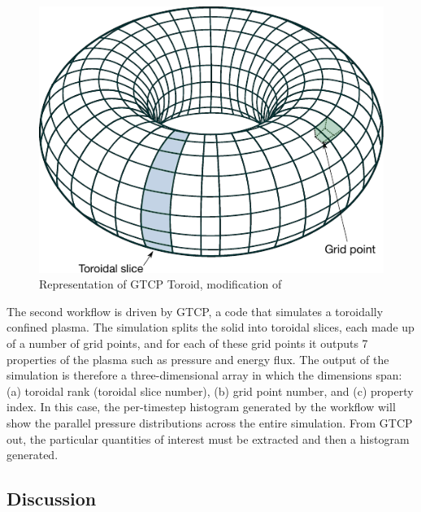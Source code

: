 \documentclass[conference]{IEEEtran}
\begin{document}
\begin{figure}
  \includegraphics[width=\columnwidth]{fig/Simple_Torus_mod}
  \caption{Representation of GTCP Toroid, modification of \cite{WikimediaCommons:torus}}
  \label{fig:lammps-workflow}
\end{figure}

The second workflow is driven by GTCP, a code that simulates a toroidally
confined plasma. The simulation splits the solid into toroidal slices, each
made up of a number of grid points, and for each of these grid points it outputs 7
properties of the plasma such as pressure and energy flux. The output of the
simulation is therefore a three-dimensional array in which the dimensions
span: (a) toroidal rank (toroidal slice number), (b) grid point number,
and (c) property index. In this case, the per-timestep histogram
generated by the workflow will show the parallel pressure distributions across the entire
simulation. From GTCP out, the particular quantities of interest must be
extracted and then a histogram generated.

\subsection{Discussion}
\end{document}
